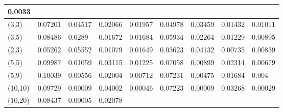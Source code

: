 \documentclass[10pt,twosided]{article}
\numberwithin{equation}{section}
\numberwithin{equation}{section}
\begin{document}
\begin{table}
\begin{tabular}{|p{41pt}|p{32pt}|p{38pt}|p{32pt}|p{38pt}|p{32pt}|p{38pt}|p{32pt}|p{38pt}|}
{0.0033
} \\
\hline
\parbox{41pt}{\raggedright
(3,3)
} & \parbox{32pt}{\raggedright
0.07201
} & \parbox{38pt}{\raggedright
0.04517
} & \parbox{32pt}{\raggedright
0.02066
} & \parbox{38pt}{\raggedright
0.01957
} & \parbox{32pt}{\raggedright
0.04978
} & \parbox{38pt}{\raggedright
0.03459
} & \parbox{32pt}{\raggedright
0.01432
} & \parbox{38pt}{\raggedright
0.01011
} \\
\hline
\parbox{41pt}{\raggedright
(3,5)
} & \parbox{32pt}{\raggedright
0.08486
} & \parbox{38pt}{\raggedright
0.0289
} & \parbox{32pt}{\raggedright
0.01672
} & \parbox{38pt}{\raggedright
0.01684
} & \parbox{32pt}{\raggedright
0.05934
} & \parbox{38pt}{\raggedright
0.02264
} & \parbox{32pt}{\raggedright
0.01229
} & \parbox{38pt}{\raggedright
0.00895
} \\
\hline
\parbox{41pt}{\raggedright
(2,3)
} & \parbox{32pt}{\raggedright
0.05262
} & \parbox{38pt}{\raggedright
0.05552
} & \parbox{32pt}{\raggedright
0.01079
} & \parbox{38pt}{\raggedright
0.01649
} & \parbox{32pt}{\raggedright
0.03623
} & \parbox{38pt}{\raggedright
0.04132
} & \parbox{32pt}{\raggedright
0.00735
} & \parbox{38pt}{\raggedright
0.00839
} \\
\hline
\parbox{41pt}{\raggedright
(5,5)
} & \parbox{32pt}{\raggedright
0.09987
} & \parbox{38pt}{\raggedright
0.01059
} & \parbox{32pt}{\raggedright
0.03115
} & \parbox{38pt}{\raggedright
0.01225
} & \parbox{32pt}{\raggedright
0.07058
} & \parbox{38pt}{\raggedright
0.00899
} & \parbox{32pt}{\raggedright
0.02314
} & \parbox{38pt}{\raggedright
0.00679
} \\
\hline
\parbox{41pt}{\raggedright
(5,9)
} & \parbox{32pt}{\raggedright
0.10039
} & \parbox{38pt}{\raggedright
0.00556
} & \parbox{32pt}{\raggedright
0.02004
} & \parbox{38pt}{\raggedright
0.00712
} & \parbox{32pt}{\raggedright
0.07231
} & \parbox{38pt}{\raggedright
0.00475
} & \parbox{32pt}{\raggedright
0.01684
} & \parbox{38pt}{\raggedright
0.004
} \\
\hline
\parbox{41pt}{\raggedright
(10,10)
} & \parbox{32pt}{\raggedright
0.09729
} & \parbox{38pt}{\raggedright
0.00009
} & \parbox{32pt}{\raggedright
0.04002
} & \parbox{38pt}{\raggedright
0.00046
} & \parbox{32pt}{\raggedright
0.07223
} & \parbox{38pt}{\raggedright
0.00009
} & \parbox{32pt}{\raggedright
0.03268
} & \parbox{38pt}{\raggedright
0.00029
} \\
\hline
\parbox{41pt}{\raggedright
(10,20)
} & \parbox{32pt}{\raggedright
0.08437
} & \parbox{38pt}{\raggedright
0.00005
} & \parbox{32pt}{\raggedright
0.02078
} & \parbox{38pt}{\raggedright
}
\end{tabular}
\end{table}
\end{document}
